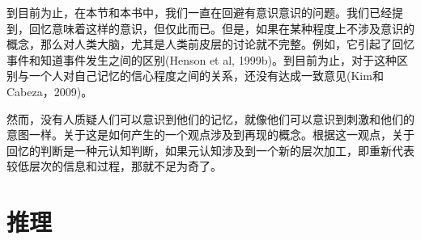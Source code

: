 到目前为止，在本节和本书中，我们一直在回避有意识意识的问题。我们已经提到，回忆意味着这样的意识，但仅此而已。但是，如果在某种程度上不涉及意识的概念，那么对人类大脑，尤其是人类前皮层的讨论就不完整。例如，它引起了回忆事件和知道事件发生之间的区别(Henson et al, 1999b)。到目前为止，对于这种区别与一个人对自己记忆的信心程度之间的关系，还没有达成一致意见(Kim和Cabeza，2009)。

然而，没有人质疑人们可以意识到他们的记忆，就像他们可以意识到刺激和他们的意图一样。关于这是如何产生的一个观点涉及到再现的概念。根据这一观点，关于回忆的判断是一种元认知判断，如果元认知涉及到一个新的层次加工，即重新代表较低层次的信息和过程，那就不足为奇了。

\section{推理}






